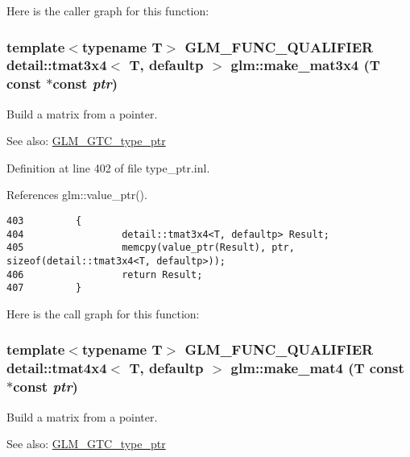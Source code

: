Here is the caller graph for this function:\hypertarget{group__gtc__type__ptr_g81d4d38acbaded29fb07ca282f089122}{
\subsubsection[make\_\-mat3x4]{\setlength{\rightskip}{0pt plus 5cm}template$<$typename T$>$ GLM\_\-FUNC\_\-QUALIFIER detail::tmat3x4$<$ T, defaultp $>$ glm::make\_\-mat3x4 (T const $\ast$const  {\em ptr})}}
\label{group__gtc__type__ptr_g81d4d38acbaded29fb07ca282f089122}


Build a matrix from a pointer. \begin{Desc}
\item[See also:]\hyperlink{group__gtc__type__ptr}{GLM\_\-GTC\_\-type\_\-ptr} \end{Desc}


Definition at line 402 of file type\_\-ptr.inl.

References glm::value\_\-ptr().

\begin{Code}\begin{verbatim}403         {
404                 detail::tmat3x4<T, defaultp> Result;
405                 memcpy(value_ptr(Result), ptr, sizeof(detail::tmat3x4<T, defaultp>));
406                 return Result;
407         }
\end{verbatim}
\end{Code}




Here is the call graph for this function:\hypertarget{group__gtc__type__ptr_g082261bc3bf4a6d320d6beaebcbaf1db}{
\subsubsection[make\_\-mat4]{\setlength{\rightskip}{0pt plus 5cm}template$<$typename T$>$ GLM\_\-FUNC\_\-QUALIFIER detail::tmat4x4$<$ T, defaultp $>$ glm::make\_\-mat4 (T const $\ast$const  {\em ptr})}}
\label{group__gtc__type__ptr_g082261bc3bf4a6d320d6beaebcbaf1db}


Build a matrix from a pointer. \begin{Desc}
\item[See also:]\hyperlink{group__gtc__type__ptr}{GLM\_\-GTC\_\-type\_\-ptr} \end{Desc}


